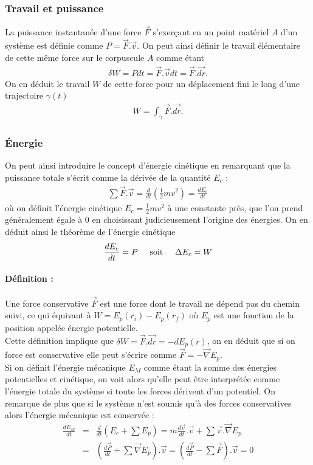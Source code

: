 \documentclass[12pt,prb,aps,epsf]{report}
\begin{document}
\subsubsection{Travail et puissance}
La puissance instantanée d'une force $\vec{F}$ s'exerçant en un point matériel $A$ d'un système est définie comme $P=\vec{F}.\vec{v}$. On peut ainsi définir le travail élémentaire de cette même force sur le corpuscule $A$ comme étant 
\begin{eqnarray}
\delta W = Pdt = \vec{F}.\vec{v}dt = \vec{F}.\vec{dr}.
\end{eqnarray} 
On en déduit le travail $W$ de cette force pour un déplacement fini le long d'une trajectoire $\gamma(t)$ 
\begin{eqnarray}
W = \int_{\gamma}\vec{F}.\vec{dr}.
\end{eqnarray} 
\subsubsection{Énergie}
On peut ainsi introduire le concept d'énergie cinétique en remarquant que la puissance totale s'écrit comme la dérivée de la quantité $E_c$ :
\begin{eqnarray}
\sum\vec{F}.\vec{v} = \frac{d}{dt}\left(\frac{1}{2}mv^2\right)=\frac{dE_c}{dt}
\end{eqnarray}
où on définit l'énergie cinétique $E_c=\frac{1}{2}mv^2$ à une constante près, que l'on prend généralement égale à 0 en choisissant judicieusement l'origine des énergies. On en déduit ainsi le théorème de l'énergie cinétique
\begin{eqnarray}
\frac{dE_c}{dt} = P \hspace{0.5cm} \mathrm{soit}\hspace{0.5cm} \Delta E_c= W
\end{eqnarray}

\paragraph{Définition :} Une force conservative $\vec{F}$ est une force dont le travail ne dépend pas du chemin suivi, ce qui équivaut à $W=E_p(r_i)-E_p(r_f)$ où $E_p$ est une fonction de la position appelée énergie potentielle.\\ Cette définition implique que $\delta W = \vec{F}.\vec{dr} = -dE_p(r)$, on en déduit que si on force est conservative elle peut s'écrire comme $\vec{F}=-\vec{\nabla}E_p$.\\

Si on définit l'énergie mécanique $E_M$ comme étant la somme des énergies potentielles et cinétique, on voit alors qu'elle peut être interprétée comme l'énergie totale du système si toute les forces dérivent d'un potentiel. On remarque de plus que si le système n'est soumis qu'à des forces conservatives alors l'énergie mécanique est conservée :
\begin{eqnarray}
\frac{dE_M}{dt} &=& \frac{d}{dt}\left(E_c+\sum E_p\right) = m\frac{d\vec{v}}{dt}.\vec{v} + \sum\vec{v}.\vec{\nabla}E_p\\ 
&=& \left(\frac{d\vec{P}}{dt} + \sum\vec{\nabla}E_p\right).\vec{v} = \left(\frac{d\vec{P}}{dt} - \sum \vec{F} \right).\vec{v} = 0
\end{eqnarray}
\end{document}
